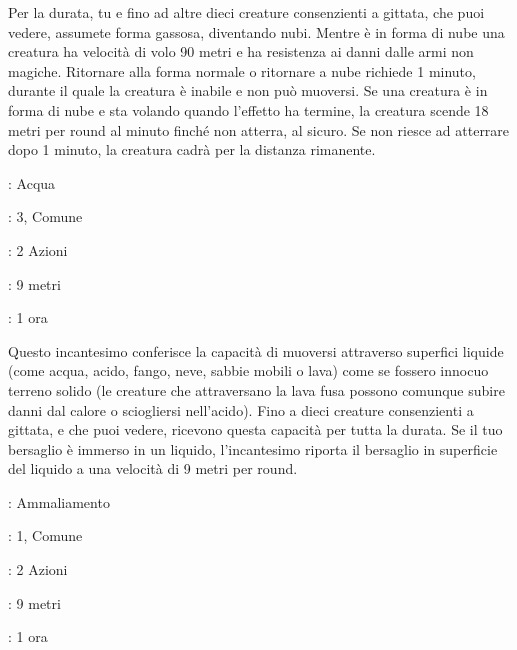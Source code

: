 \begin{multicols}{2}
Per la durata, tu e fino ad altre dieci creature consenzienti a gittata, che puoi vedere, assumete forma gassosa, diventando nubi. Mentre è in forma di nube una creatura ha velocità di volo 90 metri e ha resistenza ai danni dalle armi non magiche. Ritornare alla forma normale o ritornare a nube richiede 1 minuto, durante il quale la creatura è inabile e non può muoversi. Se una creatura è in forma di nube e sta volando quando l'effetto ha termine, la creatura scende 18 metri per round al minuto finché non atterra, al sicuro. Se non riesce ad atterrare dopo 1 minuto, la creatura cadrà per la distanza rimanente.

\noindent\colorbox{OBSSgold!10}{
\begin{minipage}{0.95\linewidth}
\begin{description}[noitemsep, topsep=0pt, parsep=0pt, partopsep=0pt, leftmargin=0cm, labelwidth=1.3cm]
	\item[\textbf{Lista}]: Acqua
	\item[\textbf{Livello}]: 3, Comune
	\item[\textbf{Lancio}]: 2 Azioni
	\item[\textbf{Gittata}]: 9 metri
	\item[\textbf{Durata}]: 1 ora
\end{description}
\end{minipage}}\smallskip

Questo incantesimo conferisce la capacità di muoversi attraverso superfici liquide (come acqua, acido, fango, neve, sabbie mobili o lava) come se fossero innocuo terreno solido (le creature che attraversano la lava fusa possono comunque subire danni dal calore o sciogliersi nell'acido). Fino a dieci creature consenzienti a gittata, e che puoi vedere, ricevono questa capacità per tutta la durata. Se il tuo bersaglio è immerso in un liquido, l'incantesimo riporta il bersaglio in superficie del liquido a una velocità di 9 metri per round.

\noindent\colorbox{OBSSgold!10}{
\begin{minipage}{0.95\linewidth}
\begin{description}[noitemsep, topsep=0pt, parsep=0pt, partopsep=0pt, leftmargin=0cm, labelwidth=1.3cm]
	\item[\textbf{Lista}]: Ammaliamento
	\item[\textbf{Livello}]: 1, Comune
	\item[\textbf{Lancio}]: 2 Azioni
	\item[\textbf{Gittata}]: 9 metri
	\item[\textbf{Durata}]: 1 ora
\end{description}
\end{minipage}}\smallskip


\end{multicols}
